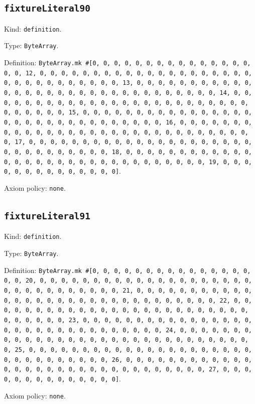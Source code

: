 \documentclass[11pt]{article}
\begin{document}
\subsection*{\texttt{fixtureLiteral90}}
\noindent Kind: \texttt{definition}.\par
\noindent Type: \texttt{ByteArray}.\par
\noindent Definition: \texttt{ByteArray.mk \#[0, 0, 0, 0, 0, 0, 0, 0, 0, 0, 0, 0, 0, 0, 0, 0, 0, 12, 0, 0, 0, 0, 0, 0, 0, 0, 0, 0, 0, 0, 0, 0, 0, 0, 0, 0, 0, 0, 0, 0, 0, 0, 0, 0, 0, 0, 0, 0, 0, 13, 0, 0, 0, 0, 0, 0, 0, 0, 0, 0, 0, 0, 0, 0, 0, 0, 0, 0, 0, 0, 0, 0, 0, 0, 0, 0, 0, 0, 0, 0, 0, 14, 0, 0, 0, 0, 0, 0, 0, 0, 0, 0, 0, 0, 0, 0, 0, 0, 0, 0, 0, 0, 0, 0, 0, 0, 0, 0, 0, 0, 0, 0, 0, 15, 0, 0, 0, 0, 0, 0, 0, 0, 0, 0, 0, 0, 0, 0, 0, 0, 0, 0, 0, 0, 0, 0, 0, 0, 0, 0, 0, 0, 0, 0, 0, 16, 0, 0, 0, 0, 0, 0, 0, 0, 0, 0, 0, 0, 0, 0, 0, 0, 0, 0, 0, 0, 0, 0, 0, 0, 0, 0, 0, 0, 0, 0, 0, 17, 0, 0, 0, 0, 0, 0, 0, 0, 0, 0, 0, 0, 0, 0, 0, 0, 0, 0, 0, 0, 0, 0, 0, 0, 0, 0, 0, 0, 0, 0, 0, 18, 0, 0, 0, 0, 0, 0, 0, 0, 0, 0, 0, 0, 0, 0, 0, 0, 0, 0, 0, 0, 0, 0, 0, 0, 0, 0, 0, 0, 0, 0, 0, 19, 0, 0, 0, 0, 0, 0, 0, 0, 0, 0, 0, 0, 0, 0]}.\par
\noindent Axiom policy: \texttt{none}.\par
\subsection*{\texttt{fixtureLiteral91}}
\noindent Kind: \texttt{definition}.\par
\noindent Type: \texttt{ByteArray}.\par
\noindent Definition: \texttt{ByteArray.mk \#[0, 0, 0, 0, 0, 0, 0, 0, 0, 0, 0, 0, 0, 0, 0, 0, 0, 20, 0, 0, 0, 0, 0, 0, 0, 0, 0, 0, 0, 0, 0, 0, 0, 0, 0, 0, 0, 0, 0, 0, 0, 0, 0, 0, 0, 0, 0, 0, 0, 21, 0, 0, 0, 0, 0, 0, 0, 0, 0, 0, 0, 0, 0, 0, 0, 0, 0, 0, 0, 0, 0, 0, 0, 0, 0, 0, 0, 0, 0, 0, 0, 22, 0, 0, 0, 0, 0, 0, 0, 0, 0, 0, 0, 0, 0, 0, 0, 0, 0, 0, 0, 0, 0, 0, 0, 0, 0, 0, 0, 0, 0, 0, 0, 23, 0, 0, 0, 0, 0, 0, 0, 0, 0, 0, 0, 0, 0, 0, 0, 0, 0, 0, 0, 0, 0, 0, 0, 0, 0, 0, 0, 0, 0, 0, 0, 24, 0, 0, 0, 0, 0, 0, 0, 0, 0, 0, 0, 0, 0, 0, 0, 0, 0, 0, 0, 0, 0, 0, 0, 0, 0, 0, 0, 0, 0, 0, 0, 25, 0, 0, 0, 0, 0, 0, 0, 0, 0, 0, 0, 0, 0, 0, 0, 0, 0, 0, 0, 0, 0, 0, 0, 0, 0, 0, 0, 0, 0, 0, 0, 26, 0, 0, 0, 0, 0, 0, 0, 0, 0, 0, 0, 0, 0, 0, 0, 0, 0, 0, 0, 0, 0, 0, 0, 0, 0, 0, 0, 0, 0, 0, 0, 27, 0, 0, 0, 0, 0, 0, 0, 0, 0, 0, 0, 0, 0, 0]}.\par
\noindent Axiom policy: \texttt{none}.\par
\end{document}
